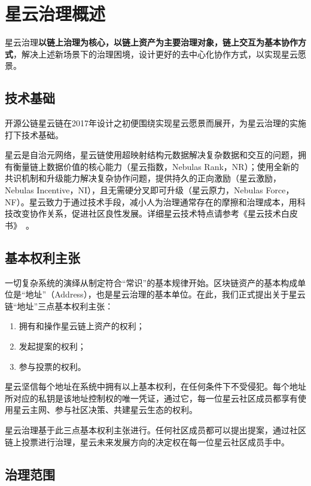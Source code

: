 \section{星云治理概述}

星云治理\textbf{以链上治理为核心，以链上资产为主要治理对象，链上交互为基本协作方式}，解决上述新场景下的治理困境，设计更好的去中心化协作方式，以实现星云愿景。

\subsection{技术基础}

开源公链星云链在2017年设计之初便围绕实现星云愿景而展开，为星云治理的实施打下技术基础。

星云是自治元网络，星云链使用超映射结构元数据解决复杂数据和交互的问题，拥有衡量链上数据价值的核心能力（星云指数，Nebulas Rank，NR）；使用全新的共识机制和升级能力解决复杂协作问题，提供持久的正向激励（星云激励，Nebulas Incentive，NI），且无需硬分叉即可升级（星云原力，Nebulas Force，NF）。星云致力于通过技术手段，减小人为治理通常存在的摩擦和治理成本，用科技改变协作关系，促进社区良性发展。详细星云技术特点请参考《星云技术白皮书》~\cite{TechWhitepaper}。

\subsection{基本权利主张}
\label{rights}

一切复杂系统的演绎从制定符合“常识”的基本规律开始。区块链资产的基本构成单位是“地址”（Address），也是星云治理的基本单位。在此，我们正式提出关于星云链“地址”三点基本权利主张：

\begin{enumerate}
	\item 拥有和操作星云链上资产的权利；
	\item 发起提案的权利；
	\item 参与投票的权利。
\end{enumerate}

星云坚信每个地址在系统中拥有以上基本权利，在任何条件下不受侵犯。每个地址所对应的私钥是该地址控制权的唯一凭证，通过它，每一位星云社区成员都享有使用星云主网、参与社区决策、共建星云生态的权利。

星云治理基于此三点基本权利主张进行。任何社区成员都可以提出提案，通过社区链上投票进行治理，星云未来发展方向的决定权在每一位星云社区成员手中。

\subsection{治理范围}

